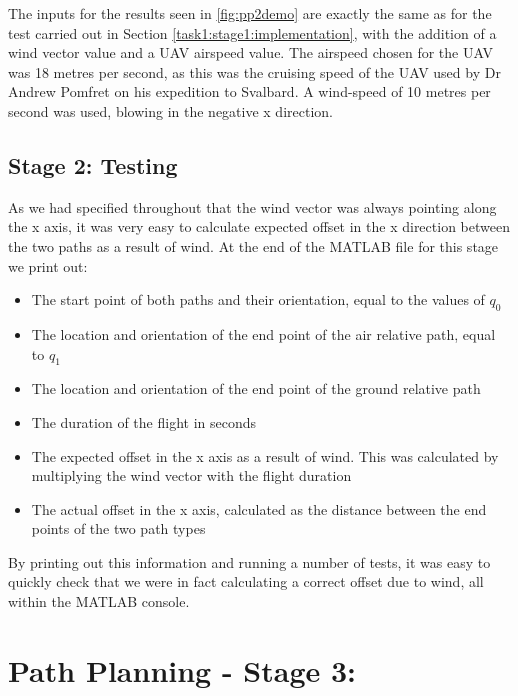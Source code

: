 The inputs for the results seen in \ref{fig:pp2demo} are exactly the same as for the test carried out in Section \ref{task1:stage1:implementation}, with the addition of a wind vector value and a UAV airspeed value. The airspeed chosen for the UAV was 18 metres per second, as this was the cruising speed of the UAV used by Dr Andrew Pomfret on his expedition to Svalbard. A wind-speed of 10 metres per second was used, blowing in the negative x direction.

\subsection{Stage 2: Testing}
\label{task1:stage2:testing}

As we had specified throughout that the wind vector was always pointing along the x axis, it was very easy to calculate expected offset in the x direction between the two paths as a result of wind. At the end of the MATLAB file for this stage we print out:

\begin{itemize}
	\item The start point of both paths and their orientation, equal to the values of $q_0$
	\item The location and orientation of the end point of the air relative path, equal to $q_1$
	\item The location and orientation of the end point of the ground relative path
	\item The duration of the flight in seconds
	\item The expected offset in the x axis as a result of wind. This was calculated by multiplying the wind vector with the flight duration
	\item The actual offset in the x axis, calculated as the distance between the end points of the two path types
\end{itemize}

By printing out this information and running a number of tests, it was easy to quickly check that we were in fact calculating a correct offset due to wind, all within the MATLAB console. 

\section{Path Planning - Stage 3: }
\label{task1:stage3}

